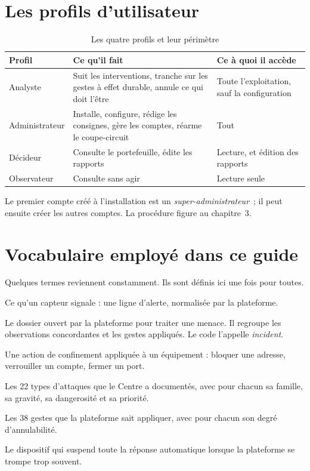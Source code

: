 \section{Les profils d'utilisateur}

\begin{table}[h]
\centering
\begin{tabular}{@{}p{2.6cm}p{5cm}p{5.4cm}@{}}
\toprule
\textbf{Profil} & \textbf{Ce qu'il fait} & \textbf{Ce à quoi il accède} \\
\midrule
Analyste &
Suit les interventions, tranche sur les gestes à effet durable, annule ce qui
doit l'être &
Toute l'exploitation, sauf la configuration \\[6pt]
Administrateur &
Installe, configure, rédige les consignes, gère les comptes, réarme le
coupe-circuit &
Tout \\[6pt]
Décideur &
Consulte le portefeuille, édite les rapports &
Lecture, et édition des rapports \\[6pt]
Observateur &
Consulte sans agir &
Lecture seule \\
\bottomrule
\end{tabular}
\caption{Les quatre profils et leur périmètre}
\end{table}

Le premier compte créé à l'installation est un \emph{super-administrateur}~;
il peut ensuite créer les autres comptes. La procédure figure au chapitre~3.

\section{Vocabulaire employé dans ce guide}

Quelques termes reviennent constamment. Ils sont définis ici une fois pour
toutes.

\begin{description}[leftmargin=3.6cm, style=nextline]
  \item[Observation] Ce qu'un capteur signale : une ligne d'alerte, normalisée
        par la plateforme.
  \item[Intervention] Le dossier ouvert par la plateforme pour traiter une
        menace. Il regroupe les observations concordantes et les gestes
        appliqués. Le code l'appelle \emph{incident}.
  \item[Geste] Une action de confinement appliquée à un équipement : bloquer
        une adresse, verrouiller un compte, fermer un port.
  \item[Catalogue métier] Les 22 types d'attaques que le Centre a documentés,
        avec pour chacun sa famille, sa gravité, sa dangerosité et sa priorité.
  \item[Catalogue de réversibilité] Les 38 gestes que la plateforme sait
        appliquer, avec pour chacun son degré d'annulabilité.
  \item[Coupe-circuit] Le dispositif qui suspend toute la réponse automatique
        lorsque la plateforme se trompe trop souvent.
\end{description}
